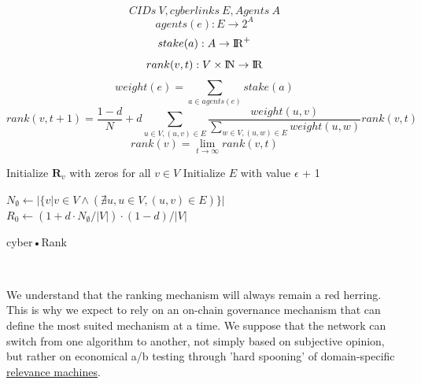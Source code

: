 \documentclass[8pt,oneside]{amsart}
\begin{document}
$$ CIDs \ V, cyberlinks \ E, Agents \ A $$
$$agents(e): E \rightarrow 2^{A}$$
$$stake(a): A \rightarrow {\rm I\!R}^+ $$
$$rank(v, t): V \times {\rm I\!N} \rightarrow {\rm I\!R} $$
$$weight(e) = \sum\limits_{a \in agents(e)}{stake(a)}$$
$$rank(v, t + 1) = \frac{1 - d}{N} + d\sum\limits_{u \in V, (u, v) \in E}{\frac{weight(u, v)}{\sum_{w \in V, (u, w) \in E}{weight(u, w)}}rank(v, t)} $$
$$rank(v) = \lim\limits_{t \rightarrow \infty} rank(v, t)$$
\begin{algorithm}


\BlankLine
Initialize $\textbf{R}_{v}$ with zeros for all $v \in V$\;
Initialize $E$ with value $\epsilon$ + 1\;

\BlankLine
$N_{\emptyset} \leftarrow |\{v|v \in V \land (\nexists u, u \in V, (u, v) \in E )\}|$ \;
$R_{0} \leftarrow (1 + d \cdot N_{\emptyset} / |V|) \cdot (1 - d) / |V| $ \;

\BlankLine
{}

\caption{cyber•Rank}\label{algo_disjdecomp}
\end{algorithm}\

We understand that the ranking mechanism will always remain a red herring. This is why we expect to rely on an on-chain governance mechanism that can define the most suited mechanism at a time. We suppose that the network can switch from one algorithm to another, not simply based on subjective opinion, but rather on economical a/b testing through 'hard spooning' of domain-specific {\hyperref[relevance-machine]{relevance machines}}.
\end{document}

